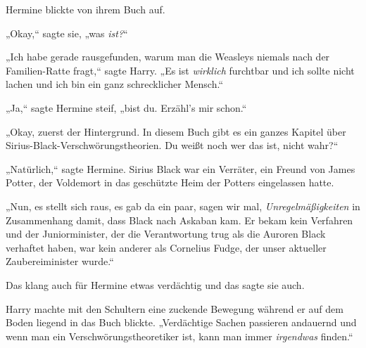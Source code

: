 Hermine blickte von ihrem Buch auf.

„Okay,“ sagte sie, „was \emph{ist?}“

„Ich habe gerade rausgefunden, warum man die Weasleys niemals nach der Familien-Ratte fragt,“ sagte Harry. „Es ist \emph{wirklich} furchtbar und ich sollte nicht lachen und ich bin ein ganz schrecklicher Mensch.“

„Ja,“ sagte Hermine steif, „bist du. Erzähl's mir schon.“

„Okay, zuerst der Hintergrund. In diesem Buch gibt es ein ganzes Kapitel über Sirius-Black-Verschwörungstheorien. Du weißt noch wer das ist, nicht wahr?“

„Natürlich,“ sagte Hermine. Sirius Black war ein Verräter, ein Freund von James Potter, der Voldemort in das geschützte Heim der Potters eingelassen hatte.

„Nun, es stellt sich raus, es gab da ein paar, sagen wir mal, \emph{Unregelmäßigkeiten} in Zusammenhang damit, dass Black nach Askaban kam. Er bekam kein Verfahren und der Juniorminister, der die Verantwortung trug als die Auroren Black verhaftet haben, war kein anderer als Cornelius Fudge, der unser aktueller Zaubereiminister wurde.“

Das klang auch für Hermine etwas verdächtig und das sagte sie auch.

Harry machte mit den Schultern eine zuckende Bewegung während er auf dem Boden liegend in das Buch blickte. „Verdächtige Sachen passieren andauernd und wenn man ein Verschwörungstheoretiker ist, kann man immer \emph{irgendwas} finden.“


